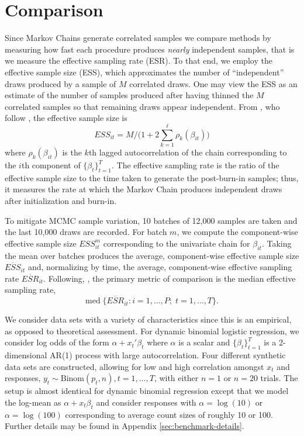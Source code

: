 \documentclass[11pt]{article}
\begin{document}
\section{Comparison}


Since Markov Chains generate correlated samples we compare methods by measuring
how fast each procedure produces \emph{nearly} independent samples, that is we
measure the effective sampling rate (ESR).  To that end, we employ the effective
sample size (ESS), which approximates the number of ``independent'' draws
produced by a sample of $M$ correlated draws.  One may view the ESS as an
estimate of the number of samples produced after having thinned the $M$
correlated samples so that remaining draws appear independent.  From
\cite{holmes-held-2006}, who follow \cite{geyer-1992}, the effective sample size
is
\[
ESS_{it} = M / \Big( 1 + 2 \sum_{k=1}^\ell \rho_k(\beta_{it}) \Big)
\]
where $\rho_k(\beta_{it})$ is the $k$th lagged autocorrelation of the chain
corresponding to the $i$th component of $\{\beta_t\}_{t=1}^T$.  The effective
sampling rate is the ratio of the effective sample size to the time taken to
generate the post-burn-in samples; thus, it measures the rate at which the
Markov Chain produces independent draws after initialization and burn-in.

To mitigate MCMC sample variation, 10 batches of 12,000 samples are taken and
the last 10,000 draws are recorded.  For batch $m$, we compute the
component-wise effective sample size $ESS_{it}^{m}$ corresponding to the
univariate chain for $\beta_{it}$.  Taking the mean over batches produces the
average, component-wise effective sample size $\overline{ESS}_{it}$ and,
normalizing by time, the average, component-wise effective sampling rate
$\overline{ESR}_{it}$.  Following, \cite{fruhwirth-schnatter-fruhwirth-2010},
the primary metric of comparison is the median effective sampling rate,
\[
\text{med} \; \Big\{ \overline{ESR}_{it} : i=1, \ldots, P; \;  t=1, \ldots, T \Big\}.
\]

We consider data sets with a variety of characteristics since this is an
empirical, as opposed to theoretical assessment.  For dynamic binomial logistic
regression, we consider log odds of the form $\alpha + x_t' \beta_t$ where
$\alpha$ is a scalar and $\{\beta_t\}_{t=1}^T$ is a 2-dimensional AR(1) process
with large autocorrelation.  Four different synthetic data sets are constructed,
allowing for low and high correlation amongst $x_t$ and responses, $y_t \sim
\text{Binom}(p_t, n), t=1, \ldots, T$, with either $n=1$ or $n=20$ trials.  The
setup is almost identical for dynamic binomial regression except that we model
the log-mean as $\alpha + x_t \beta_t$ and consider responses with $\alpha =
\log(10)$ or $\alpha = \log(100)$ corresponding to average count sizes of
roughly 10 or 100.  Further details may be found in Appendix
\ref{sec:benchmark-details}.
\end{document}
